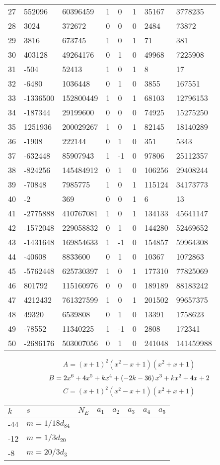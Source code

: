 \documentclass{amsart}
\begin{document}
\begin{longtable}{|l|l|l|lllll|}
27&552096&60396459&1&0&1&35167&3778235\\
28&3024&372672&0&0&0&2484&73872\\
29&3816&673745&1&0&1&71&381\\
30&403128&49264176&0&1&0&49968&7225908\\
31&-504&52413&1&0&1&8&17\\
32&-6480&1036448&0&1&0&3855&167551\\
33&-1336500&152800449&1&0&1&68103&12796153\\
34&-187344&29199600&0&0&0&74925&15275250\\
35&1251936&200029267&1&0&1&82145&18140289\\
36&-1908&222144&0&1&0&351&5343\\
37&-632448&85907943&1&-1&0&97806&25112357\\
38&-824256&145484912&0&1&0&106256&29408244\\
39&-70848&7985775&1&0&1&115124&34173773\\
40&-2&369&0&0&1&6&13\\
41&-2775888&410767081&1&0&1&134133&45641147\\
42&-1572048&229058832&0&1&0&144280&52469652\\
43&-1431648&169854633&1&-1&0&154857&59964308\\
44&-40608&8833600&0&1&0&10367&1072863\\
45&-5762448&625730397&1&0&1&177310&77825069\\
46&801792&115160976&0&0&0&189189&88183242\\
47&4212432&761327599&1&0&1&201502&99657375\\
48&49320&6539808&0&1&0&13391&1758623\\
49&-78552&11340225&1&-1&0&2808&172341\\
50&-2686176&503007056&0&1&0&241048&141459988\\
\hline
\end{longtable}
$$A=(x
 + 1)^{2}(x^2
 - x
 + 1)(x^2
 + x
 + 1)$$
$$B=2\*x^6
 + 4\*x^5
 + k\*x^4
 + \left(-2\*k
 - 36\right) \*x^3
 + k\*x^2
 + 4\*x
 + 2$$
$$C=(x
 + 1)^{2}(x^2
 - x
 + 1)(x^2
 + x
 + 1)$$
\begin{longtable}{|l|l|l|lllll|}
\hline
$k$ & $s$ & $N_E$ & $a_1$ & $a_2$ & $a_3$ & $a_4$ & $a_5$\\
\hline
-44&$m=1/18d_{84}$&&\multicolumn{5}{c|}{}\\
-12&$m=1/3d_{20}$&&\multicolumn{5}{c|}{}\\
-8&$m=20/3d_{3}$&&\multicolumn{5}{c|}{}\\
\hline
\end{longtable}
\end{document}

